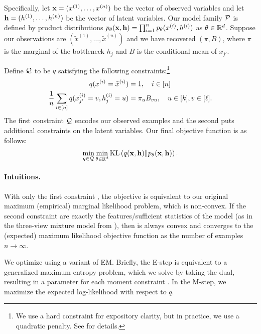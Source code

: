 Specifically,
let $\mathbf{x} = (x^{(1)}, \dots, x^{(n)})$ be the vector of observed variables
and let
$\mathbf{h} = (h^{(1)}, \dots, h^{(n)})$ be the vector of latent variables.
Our model family $\mathcal{P}$ is defined by product distributions
$p_\theta(\mathbf{x},\mathbf{h}) = \prod_{i=1}^n p_\theta(x^{(i)}, h^{(i)})$ as $\theta \in \mathbb{R}^d$.
Suppose our observations are $(\tilde x^{(1)}, \dots, \tilde x^{(n)})$
and we have recovered $(\pi,B)$, where $\pi$ is the marginal of the bottleneck $h_j$ and $B$ is the conditional mean of $x_{j'}$.

Define $\mathcal{Q}$ to be $q$ satisfying the following constraints:\footnote{We use a hard constraint
for expository clarity, but in practice, we use a quadratic penalty.  See
\citet{liang09measurements} for details.}
\begin{align}
  q(x^{(i)} = \tilde x^{(i)}) &= 1, \quad i \in [n] \label{eqn:exConstraint} \\
  \frac{1}{n} \sum_{i \in [n]} q(x_{j'}^{(i)} = v, h_j^{(i)} = u) &= \pi_u B_{v u}, \quad u \in [k], v \in [\ell]. \label{eqn:momentConstraint}
\end{align}
The first constraint $\mathcal{Q}$ encodes our observed examples
and the second puts additional constraints on the latent variables.
Our final objective function is as follows:
\begin{align}
  \min_{q \in \mathcal{Q}} \min_{\theta \in \mathbb{R}^d} \text{KL}\left( q(\mathbf{x}, \mathbf{h}) \| p_\theta(\mathbf{x}, \mathbf{h}) \right). \label{eqn:minKL}
\end{align}
\paragraph{Intuitions.}
With only the first constraint , the objective
 is equivalent to our original maximum (empirical) marginal
likelihood problem, which is non-convex.  If the second constraint
 are exactly the features/sufficient statistics of the
model (as in the three-view mixture model from ),
then  is always convex and
converges to the (expected) maximum likelihood objective function as the number of examples $n \to\infty$.

We optimize  using a variant of EM.
Briefly, the E-step is equivalent to a generalized maximum entropy problem,
which we solve by taking the dual, resulting in a parameter for each moment constraint .
In the M-step, we maximize the expected log-likelihood with respect to $q$.

